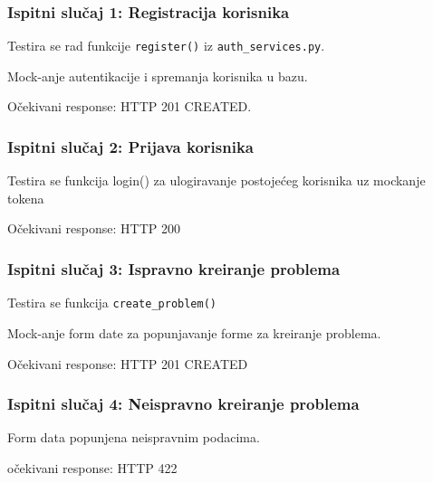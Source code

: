 			\subsubsection{Ispitni slučaj 1: Registracija korisnika}
				\begin{packed_item}
					
					\item Testira se rad funkcije \texttt{register()} iz \texttt{auth\_services.py}.
					\item Mock-anje autentikacije i spremanja korisnika u bazu.
					\item Očekivani response: HTTP 201 CREATED.
				\end{packed_item}
				
			\subsubsection{Ispitni slučaj 2: Prijava korisnika}
				\begin{packed_item}
					\item Testira se funkcija login() za ulogiravanje postojećeg korisnika uz mockanje tokena
					\item Očekivani response: HTTP 200
				\end{packed_item}
			
			\subsubsection{Ispitni slučaj 3: Ispravno kreiranje problema}
				\begin{packed_item}
					\item Testira se funkcija \texttt{create\_problem()}
					\item Mock-anje form date za popunjavanje forme za kreiranje problema.
					\item Očekivani response: HTTP 201 CREATED
				\end{packed_item}
			
			\subsubsection{Ispitni slučaj 4: Neispravno kreiranje problema}
				\begin{packed_item}
					\item Form data popunjena neispravnim podacima.
					\item očekivani response: HTTP 422
			 	\end{packed_item}	
			 	
